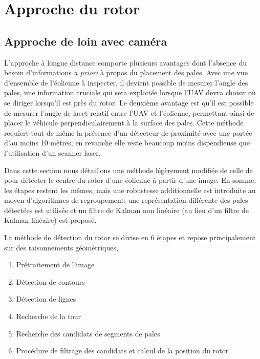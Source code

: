 \section{Approche du rotor}

\subsection{Approche de loin avec caméra}
\label{subsec:approche_loin}

L'approche à longue distance comporte plusieurs avantages dont l'absence du besoin d'informations \textit{a priori} à propos du placement des pales. Avec une vue d'ensemble de l'éolienne à inspecter, il devient possible de mesurer l'angle des pales, une information cruciale qui sera exploitée lorsque l'UAV devra choisir où se diriger lorsqu'il est près du rotor. Le deuxième avantage est qu'il est possible de mesurer l'angle de lacet relatif entre l'UAV et l'éolienne, permettant ainsi de placer le véhicule perpendiculairement à la surface des pales. Cette méthode requiert tout de même la présence d'un détecteur de proximité avec une portée d'au moins 10 mètres; en revanche elle reste beaucoup moins dispendieuse que l'utilisation d'un scanner laser.

Dans cette section nous détaillons une méthode légèrement modifiée de celle de \citep{Stokkeland2015} pour détecter le centre du rotor d'une éolienne à partir d'une image. En somme, les étapes restent les mêmes, mais une robustesse additionnelle est introduite au moyen d'algorithmes de regroupement; une représentation différente des pales détectées est utilisée et un filtre de Kalman non linéaire (au lieu d'un filtre de Kalman linéaire) est proposé.

La méthode de détection du rotor se divise en 6 étapes et repose principalement sur des raisonnements géométriques,

\begin{enumerate}
  \item Prétraitement de l'image
  \item Détection de contours
  \item Détection de lignes
  \item Recherche de la tour
  \item Recherche des candidats de segments de pales
  \item Procédure de filtrage des candidats et calcul de la position du rotor
\end{enumerate}

